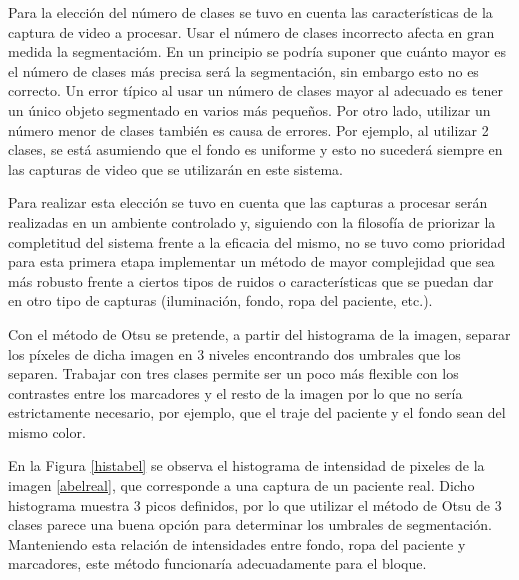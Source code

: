 Para la elección del número de clases se tuvo en cuenta las características de la captura de video a procesar. Usar el número de clases incorrecto afecta en gran medida la segmentacióm. En un principio se podría suponer que cuánto mayor es el número de clases más precisa será la segmentación, sin embargo esto no es correcto. Un error típico al usar un número de clases mayor al adecuado es tener un único objeto segmentado en varios más pequeños. Por otro lado, utilizar un número menor de clases también es causa de errores. Por ejemplo, al utilizar 2 clases, se está asumiendo que el fondo es uniforme y esto no sucederá siempre en las capturas de video que se utilizarán en este sistema.

Para realizar esta elección se tuvo en cuenta que las capturas a procesar serán realizadas en un ambiente controlado y, siguiendo con la filosofía de priorizar la completitud del sistema frente a la eficacia del mismo, no se tuvo como prioridad para esta primera etapa implementar un método de mayor complejidad que sea más robusto frente a ciertos tipos de ruidos o características que se puedan dar en otro tipo de capturas (iluminación, fondo, ropa del paciente, etc.). 

Con el método de Otsu \cite{otsu} se pretende, a partir del histograma de la imagen, separar los píxeles de dicha imagen en 3 niveles encontrando dos umbrales que los separen. Trabajar con tres clases permite ser un poco más flexible con los contrastes entre los marcadores y el resto de la imagen por lo que no sería estrictamente necesario, por ejemplo, que el traje del paciente y el fondo sean del mismo color.

En la Figura \ref{histabel} se observa el histograma de intensidad de pixeles de la imagen \ref{abelreal}, que corresponde a una captura de un paciente real. Dicho histograma muestra 3 picos definidos, por lo que utilizar el método de Otsu de 3 clases parece una buena opción para determinar los umbrales de segmentación. Manteniendo esta relación de intensidades entre fondo, ropa del paciente y marcadores, este método funcionaría adecuadamente para el bloque.

